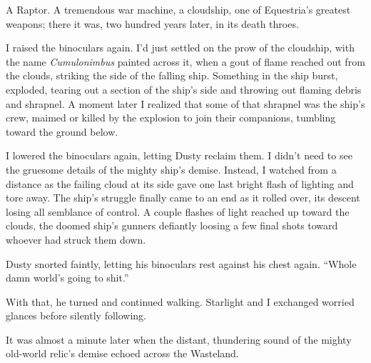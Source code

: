 A Raptor. A tremendous war machine, a cloudship, one of Equestria’s greatest weapons; there it was, two hundred years later, in its death throes.

I raised the binoculars again. I’d just settled on the prow of the cloudship, with the name \textit{Cumulonimbus} painted across it, when a gout of flame reached out from the clouds, striking the side of the falling ship. Something in the ship burst, exploded, tearing out a section of the ship’s side and throwing out flaming debris and shrapnel. A moment later I realized that some of that shrapnel was the ship’s crew, maimed or killed by the explosion to join their companions, tumbling toward the ground below.

I lowered the binoculars again, letting Dusty reclaim them. I didn’t need to see the gruesome details of the mighty ship’s demise. Instead, I watched from a distance as the failing cloud at its side gave one last bright flash of lighting and tore away. The ship’s struggle finally came to an end as it rolled over, its descent losing all semblance of control. A couple flashes of light reached up toward the clouds, the doomed ship’s gunners defiantly loosing a few final shots toward whoever had struck them down.

Dusty snorted faintly, letting his binoculars rest against his chest again. “Whole damn world’s going to shit.”

With that, he turned and continued walking. Starlight and I exchanged worried glances before silently following.

It was almost a minute later when the distant, thundering sound of the mighty old-world relic’s demise echoed across the Wasteland.